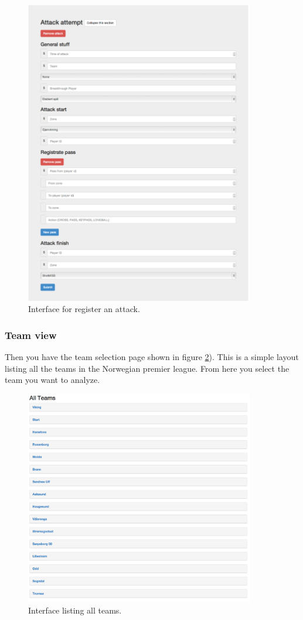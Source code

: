 \begin{figure}[ht!]
\centering
\includegraphics[width=100mm]{images/general/reg_attack.png}
\caption{Interface for register an attack.}
\label{fig:reg_attack}
\end{figure}

\subsubsection{Team view}

Then you have the team selection page shown in figure \ref{fig:all_teams}). This is a simple layout listing all the teams in the Norwegian premier league. From here you select the team you want to analyze.

\begin{figure}[ht!]
\centering
\includegraphics[width=100mm]{images/general/all_teams.png}
\caption{Interface listing all teams.}
\label{fig:all_teams}
\end{figure}

